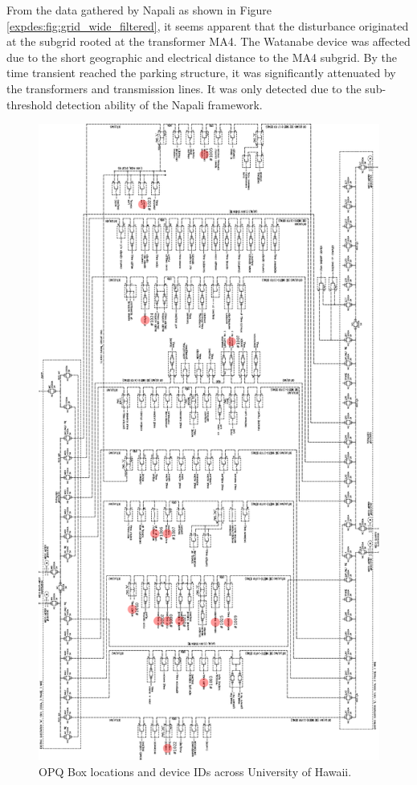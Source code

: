 From the data gathered by Napali as shown in Figure \ref{expdes:fig:grid_wide_filtered}, it seems apparent that the disturbance originated at the subgrid rooted at the transformer MA4.
The Watanabe device was affected due to the short geographic and electrical distance to the MA4 subgrid.
By the time transient reached the parking structure, it was significantly attenuated by the transformers and transmission lines.
It was only detected due to the sub-threshold detection ability of the Napali framework.
\clearpage
\begin{figure}[h]
    \centering
    \includegraphics[width=0.7\linewidth]{img/deployment/uh_power_grid.pdf}
    \caption{OPQ Box locations and device IDs across University of Hawaii.}
    \label{expdes:fig:deploy}
\end{figure}

\clearpage

